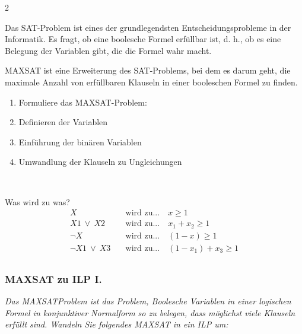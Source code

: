 \documentclass{article}
\begin{document}
\begin{multicols}{2}
\begin{definitionbox}[title=Satisfiability Problem\index{SAT}]
Das SAT-Problem ist eines der grundlegendsten Entscheidungsprobleme in der Informatik. Es fragt, ob eine boolesche Formel erfüllbar ist, d. h., ob es eine Belegung der Variablen gibt, die die Formel wahr macht.
\end{definitionbox}
\begin{definitionbox}[title=Maximum Satisfiability Problem \index{SAT!MAXSAT}] 
MAXSAT ist eine Erweiterung des SAT-Problems, bei dem es darum geht, die maximale Anzahl von erfüllbaren Klauseln in einer booleschen Formel zu finden. \newline
\end{definitionbox}
\end{multicols}
\begin{action}[title=Umwandlung eines MAXSAT-Problems in  ein LIP]
\begin{minipage}{8cm}
\begin{enumerate}
    \item Formuliere das MAXSAT-Problem:
    \item Definieren der Variablen 
    \item Einführung der binären Variablen
    \item Umwandlung der Klauseln zu Ungleichungen
\end{enumerate}
\end{minipage}
\begin{minipage}{0.5cm}
$\ $
\end{minipage}
\begin{minipage}{8cm}
Was wird zu was?
\begin{align*}
    X \quad & \text{wird zu...} \quad   x \geq 1 \\
    X1\ \vee\ X2 \quad & \text{wird zu...} \quad  x_1 + x_2 \geq 1 \\
    \neg X \quad & \text{wird zu...} \quad  (1-x) \geq 1  \\
    \neg X1\ \vee\ X3  \quad & \text{wird zu...} \quad  (1 - x_1) + x_3 \geq 1 \\
\end{align*}
\end{minipage}
\end{action}

\newpage
\subsubsection{MAXSAT zu ILP I. \textcolor{ForestGreen}{\CheckmarkBold}} 
\textit{Das MAXSATProblem ist das Problem, Boolesche Variablen  in einer logischen Formel in konjunktiver Normalform  so zu belegen, dass möglichst viele Klauseln erfüllt sind. Wandeln Sie folgendes MAXSAT in ein ILP um: } \cite{probeklausur21} \cite{probeklausur24}
 
\end{document}
